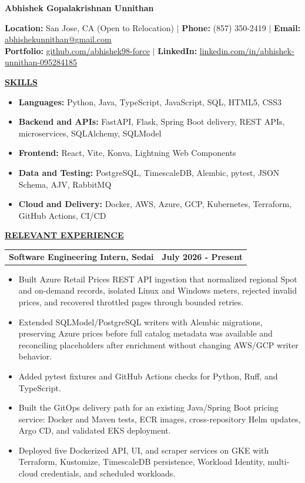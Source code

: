 \documentclass[letterpaper,10pt]{article}
\makeatletter
\newcommand{\resumeSection}[1]{%
  \vspace{12.2bp}
  {\bfseries\underline{#1}}\par
}
\newcommand{\resumeSubheading}[2]{%
  \begin{tabular*}{\textwidth}{@{}l@{\extracolsep{\fill}}r@{}}
    \bfseries #1 & \bfseries #2
  \end{tabular*}\par
}
\newcommand{\resumeSubHeadingListStart}{\begingroup}
\newcommand{\resumeItemListStart}{%
  \begin{itemize}[
    leftmargin=36bp,
    labelindent=18.8bp,
    labelwidth=4.2bp,
    labelsep=13bp,
    topsep=0pt,
    partopsep=0pt,
    parsep=0pt,
    itemsep=0pt
  ]
}
\newcommand{\resumeItemListEnd}{\end{itemize}}
\newcommand{\resumeItem}[1]{\item #1}
\newcommand{\resumeSubItem}[2]{\resumeItem{\textbf{#1:} #2}}
\makeatother
\begin{document}
\fontsize{10bp}{12.2bp}\selectfont

\vspace*{0.9bp}
{\centering\fontsize{14bp}{17bp}\selectfont\bfseries
Abhishek Gopalakrishnan Unnithan\par}
\fontsize{10bp}{12.2bp}\selectfont

\begin{center}
  \textbf{Location:} San Jose, CA (Open to Relocation)
  \enspace $\vert$ \enspace
  \textbf{Phone:} (857) 350-2419
  \enspace $\vert$ \enspace
  \textbf{Email:} \href{mailto:abhishekunnithan@gmail.com}{abhishekunnithan@gmail.com} \\
  \textbf{Portfolio:} \href{https://github.com/abhishek98-force}{\underline{github.com/abhishek98-force}}
  \enspace $\vert$ \enspace
  \textbf{LinkedIn:} \href{https://linkedin.com/in/abhishek-unnithan-095284185/}{\underline{linkedin.com/in/abhishek-unnithan-095284185}}
\end{center}

\vspace{3.3bp}
\resumeSection{SKILLS}
\resumeItemListStart
  \resumeSubItem{Languages}{Python, Java, TypeScript, JavaScript, SQL, HTML5, CSS3}
  \resumeSubItem{Backend and APIs}{FastAPI, Flask, Spring Boot delivery, REST APIs, microservices, SQLAlchemy, SQLModel}
  \resumeSubItem{Frontend}{React, Vite, Konva, Lightning Web Components}
  \resumeSubItem{Data and Testing}{PostgreSQL, TimescaleDB, Alembic, pytest, JSON Schema, AJV, RabbitMQ}
  \resumeSubItem{Cloud and Delivery}{Docker, AWS, Azure, GCP, Kubernetes, Terraform, GitHub Actions, CI/CD}
\resumeItemListEnd

\resumeSection{RELEVANT EXPERIENCE}
\resumeSubHeadingListStart

\resumeSubheading{Software Engineering Intern, Sedai}{July 2026 - Present}
\resumeItemListStart
  \resumeItem{Built Azure Retail Prices REST API ingestion that normalized regional Spot and on-demand records, isolated Linux and Windows meters, rejected invalid prices, and recovered throttled pages through bounded retries.}
  \resumeItem{Extended SQLModel/PostgreSQL writers with Alembic migrations, preserving Azure prices before full catalog metadata was available and reconciling placeholders after enrichment without changing AWS/GCP writer behavior.}
  \resumeItem{Added pytest fixtures and GitHub Actions checks for Python, Ruff, and TypeScript.}
  \resumeItem{Built the GitOps delivery path for an existing Java/Spring Boot pricing service: Docker and Maven tests, ECR images, cross-repository Helm updates, Argo CD, and validated EKS deployment.}
  \resumeItem{Deployed five Dockerized API, UI, and scraper services on GKE with Terraform, Kustomize, TimescaleDB persistence, Workload Identity, multi-cloud credentials, and scheduled workloads.}
\resumeItemListEnd
\end{document}
